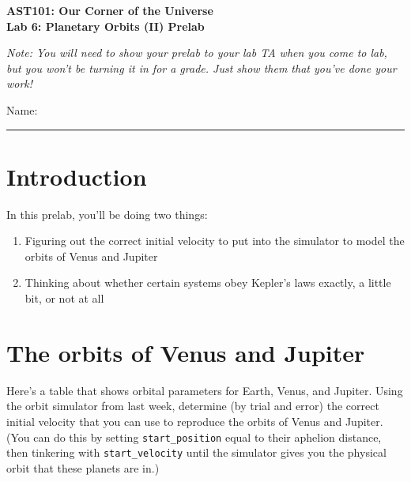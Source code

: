 \documentclass[11pt]{article}
\begin{document}
\begin{center}
\textbf{\Large
AST101: Our Corner of the Universe \\
\vspace*{0.1cm}
Lab 6: Planetary Orbits (II) Prelab
}

\normalsize
\it Note: You will need to show your prelab to your lab TA when you come to lab, but you won't be turning it in for a grade. Just show them that you've done your work!
\end{center}

\vspace*{0.5cm}

{\Large Name:}\vspace*{0.5cm}\\\hrule

\vspace*{0.5cm}

\section{Introduction}

In this prelab, you'll be doing two things:

\begin{enumerate}
	\item Figuring out the correct initial velocity to put into the simulator to model the orbits of Venus and Jupiter
	\item Thinking about whether certain systems obey Kepler's laws exactly, a little bit, or not at all
\end{enumerate}


\section{The orbits of Venus and Jupiter}

Here's a table that shows orbital parameters for Earth, Venus, and Jupiter. Using the orbit simulator from last week, determine (by trial and error) the correct initial velocity that you can use to reproduce the orbits of Venus and Jupiter. (You can do this by setting {\tt start\_position} equal to their aphelion distance, then tinkering with {\tt start\_velocity} until the simulator gives you the physical orbit that these planets are in.)
\end{document}
